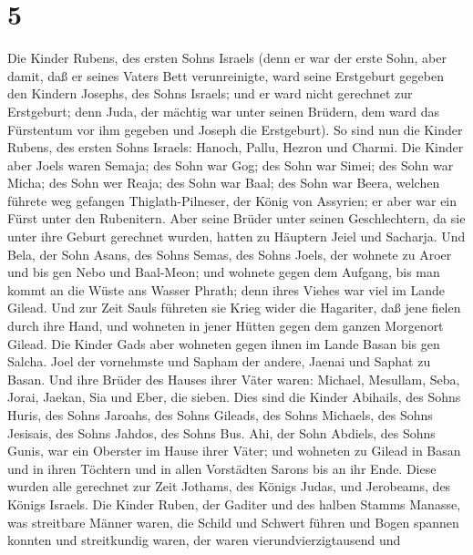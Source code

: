 \hypertarget{section-4}{%
\section{5}\label{section-4}}

 Die Kinder Rubens, des ersten Sohns Israels (denn er war
der erste Sohn, aber damit, daß er seines Vaters Bett verunreinigte,
ward seine Erstgeburt gegeben den Kindern Josephs, des Sohns Israels;
und er ward nicht gerechnet zur Erstgeburt;  denn Juda, der
mächtig war unter seinen Brüdern, dem ward das Fürstentum vor ihm
gegeben und Joseph die Erstgeburt).  So sind nun die Kinder
Rubens, des ersten Sohns Israels: Hanoch, Pallu, Hezron und Charmi.
 Die Kinder aber Joels waren Semaja; des Sohn war Gog; des
Sohn war Simei;  des Sohn war Micha; des Sohn wer Reaja; des
Sohn war Baal;  des Sohn war Beera, welchen führete weg
gefangen Thiglath-Pilneser, der König von Assyrien; er aber war ein
Fürst unter den Rubenitern.  Aber seine Brüder unter seinen
Geschlechtern, da sie unter ihre Geburt gerechnet wurden, hatten zu
Häuptern Jeiel und Sacharja.  Und Bela, der Sohn Asans, des
Sohns Semas, des Sohns Joels, der wohnete zu Aroer und bis gen Nebo und
Baal-Meon;  und wohnete gegen dem Aufgang, bis man kommt an
die Wüste ans Wasser Phrath; denn ihres Viehes war viel im Lande Gilead.
 Und zur Zeit Sauls führeten sie Krieg wider die Hagariter,
daß jene fielen durch ihre Hand, und wohneten in jener Hütten gegen dem
ganzen Morgenort Gilead.  Die Kinder Gads aber wohneten
gegen ihnen im Lande Basan bis gen Salcha.  Joel der
vornehmste und Sapham der andere, Jaenai und Saphat zu Basan.
 Und ihre Brüder des Hauses ihrer Väter waren: Michael,
Mesullam, Seba, Jorai, Jaekan, Sia und Eber, die sieben. 
Dies sind die Kinder Abihails, des Sohns Huris, des Sohns Jaroahs, des
Sohns Gileads, des Sohns Michaels, des Sohns Jesisais, des Sohns Jahdos,
des Sohns Bus.  Ahi, der Sohn Abdiels, des Sohns Gunis, war
ein Oberster im Hause ihrer Väter;  und wohneten zu Gilead
in Basan und in ihren Töchtern und in allen Vorstädten Sarons bis an ihr
Ende.  Diese wurden alle gerechnet zur Zeit Jothams, des
Königs Judas, und Jerobeams, des Königs Israels.  Die
Kinder Ruben, der Gaditer und des halben Stamms Manasse, was streitbare
Männer waren, die Schild und Schwert führen und Bogen spannen konnten
und streitkundig waren, der waren vierundvierzigtausend und
